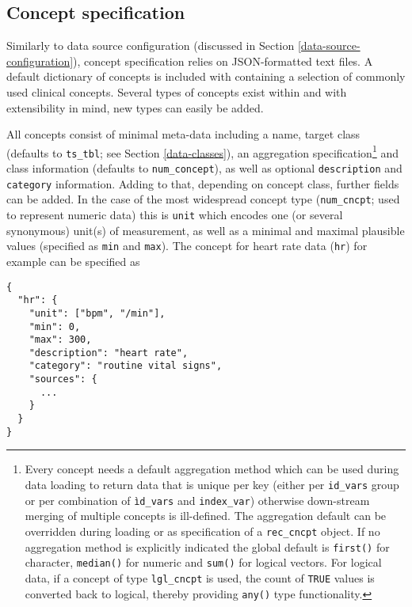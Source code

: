 \documentclass[
]{jss}
\begin{document}
\hypertarget{concept-specification}{%
\subsection{Concept specification}\label{concept-specification}}

Similarly to data source configuration (discussed in Section
\ref{data-source-configuration}), concept specification relies on
JSON-formatted text files. A default dictionary of concepts is included
with  containing a selection of commonly used clinical
concepts. Several types of concepts exist within  and with
extensibility in mind, new types can easily be added.

All concepts consist of minimal meta-data including a name, target class
(defaults to \texttt{ts\_tbl}; see Section \ref{data-classes}), an
aggregation specification\footnote{Every concept needs a default
  aggregation method which can be used during data loading to return
  data that is unique per key (either per \texttt{id\_vars} group or per
  combination of \texttt{ìd\_vars} and \texttt{index\_var}) otherwise
  down-stream merging of multiple concepts is ill-defined. The
  aggregation default can be overridden during loading or as
  specification of a \texttt{rec\_cncpt} object. If no aggregation
  method is explicitly indicated the global default is \texttt{first()}
  for character, \texttt{median()} for numeric and \texttt{sum()} for
  logical vectors. For logical data, if a concept of type
  \texttt{lgl\_cncpt} is used, the count of \texttt{TRUE} values is
  converted back to logical, thereby providing \texttt{any()} type
  functionality.} and class information (defaults to
\texttt{num\_concept}), as well as optional \texttt{description} and
\texttt{category} information. Adding to that, depending on concept
class, further fields can be added. In the case of the most widespread
concept type (\texttt{num\_cncpt}; used to represent numeric data) this
is \texttt{unit} which encodes one (or several synonymous) unit(s) of
measurement, as well as a minimal and maximal plausible values
(specified as \texttt{min} and \texttt{max}). The concept for heart rate
data (\texttt{hr}) for example can be specified as

\begin{verbatim}
{
  "hr": {
    "unit": ["bpm", "/min"],
    "min": 0,
    "max": 300,
    "description": "heart rate",
    "category": "routine vital signs",
    "sources": {
      ...
    }
  }
}
\end{verbatim}
\end{document}
